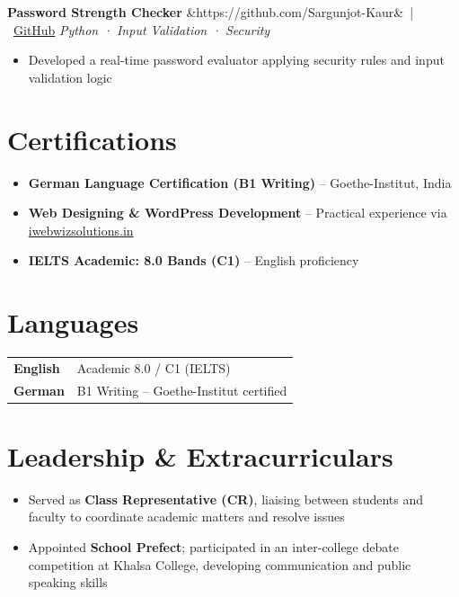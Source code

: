 \documentclass[11pt, a4paper]{article}
\newcommand{\cvproject}[4]{%
  \textbf{#1}%
  \ifx&#2&\else\ \textcolor{muted}{\small|\ \href{#2}{GitHub}}\fi
  \hfill \textcolor{muted}{\small\textit{#3}}\\[2pt]
  #4
  \vspace{6pt}
}
\newenvironment{cvlist}{%
  \begin{itemize}[leftmargin=1.4em, itemsep=1pt, parsep=0pt, topsep=2pt]
}{%
  \end{itemize}
}
\begin{document}
\cvproject%
  {Password Strength Checker}%
  {https://github.com/Sargunjot-Kaur}%
  {Python · Input Validation · Security}%
  {%
    \begin{cvlist}
      \item Developed a real-time password evaluator applying security rules and
            input validation logic
    \end{cvlist}
  }



\section{Certifications}

\begin{cvlist}
  \item \textbf{German Language Certification (B1 Writing)} -- Goethe-Institut, India
  \item \textbf{Web Designing \& WordPress Development} -- Practical experience via
        \href{https://iwebwizsolutions.in}{iwebwizsolutions.in}
  \item \textbf{IELTS Academic: 8.0 Bands (C1)} -- English proficiency
\end{cvlist}





\section{Languages}

\begin{tabularx}{\linewidth}{@{}>{\bfseries\small}p{3.2cm} X@{}}
  English & Academic 8.0 / C1 (IELTS) \\
  German  & B1 Writing -- Goethe-Institut certified \\
\end{tabularx}





\section{Leadership \& Extracurriculars}

\begin{cvlist}
  \item Served as \textbf{Class Representative (CR)}, liaising between students and faculty
        to coordinate academic matters and resolve issues
  \item Appointed \textbf{School Prefect}; participated in an inter-college debate competition
        at Khalsa College, developing communication and public speaking skills
\end{cvlist}
\end{document}
